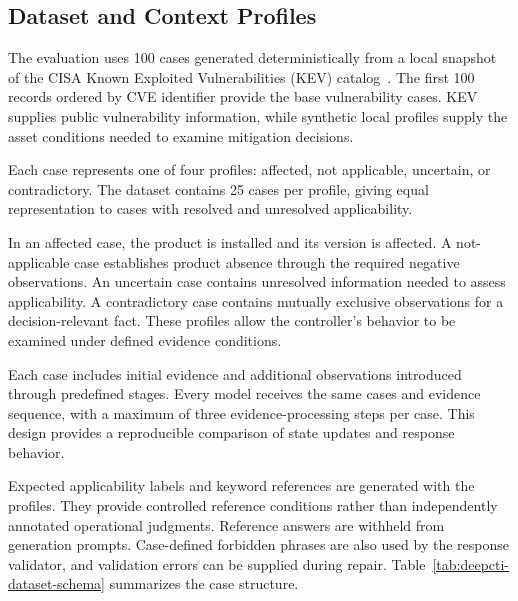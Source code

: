 \documentclass[conference]{IEEEtran}
\begin{document}
\subsection{Dataset and Context Profiles}

The evaluation uses 100 cases generated deterministically from a local
snapshot of the CISA Known Exploited Vulnerabilities (KEV)
catalog~\cite{cisa_kev}. The first 100 records ordered by CVE identifier
provide the base vulnerability cases. KEV supplies public vulnerability
information, while synthetic local profiles supply the asset conditions
needed to examine mitigation decisions.

Each case represents one of four profiles: affected, not applicable,
uncertain, or contradictory. The dataset contains 25 cases per profile,
giving equal representation to cases with resolved and unresolved
applicability.

In an affected case, the product is installed and its version is
affected. A not-applicable case establishes product absence through
the required negative observations. An uncertain case contains
unresolved information needed to assess applicability. A contradictory
case contains mutually exclusive observations for a decision-relevant
fact. These profiles allow the controller's behavior to be examined
under defined evidence conditions.

Each case includes initial evidence and additional observations
introduced through predefined stages. Every model receives the same
cases and evidence sequence, with a maximum of three evidence-processing
steps per case. This design provides a reproducible comparison of
state updates and response behavior.

Expected applicability labels and keyword references are generated
with the profiles. They provide controlled reference conditions rather
than independently annotated operational judgments. Reference answers
are withheld from generation prompts. Case-defined forbidden phrases
are also used by the response validator, and validation errors can be
supplied during repair. Table~\ref{tab:deepcti-dataset-schema} summarizes
the case structure.
\end{document}
